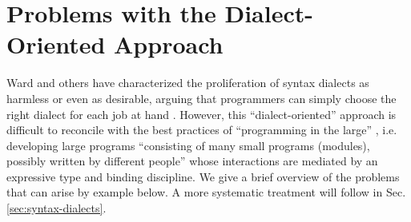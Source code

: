 
\vspace{-5px}
\section{Problems with the Dialect-Oriented Approach}\label{sec:problems-with-dialects}
Ward and others have characterized the proliferation of syntax dialects as harmless or even as desirable, arguing that programmers can simply choose the right dialect for each job at hand \cite{journals/stp/Ward94}. However, this ``dialect-oriented'' approach is difficult to reconcile with the best practices of ``programming in the large''  \cite{DeRemer76}, i.e. developing large programs ``consisting of many small programs (modules), possibly written by different people'' whose interactions are mediated by an expressive type and binding discipline. We give a brief overview of the problems that can arise by example below. A more systematic treatment will follow in  Sec. \ref{sec:syntax-dialects}.


